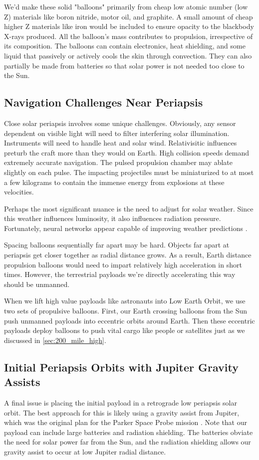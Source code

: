 \documentclass{article}
\begin{document}
{We'd make these solid "balloons" primarily from cheap low atomic number (low Z) materials like boron nitride, motor oil, and graphite.  A small amount of cheap higher Z materials like iron would be included to ensure opacity to the blackbody X-rays produced.  
All the balloon's mass contributes to propulsion, irrespective of its composition.  The balloons can contain electronics, heat shielding, and some liquid that passively or actively cools the skin through convection.     They can also partially be made from batteries so that solar power is not needed too close to the Sun.    

\subsection{Navigation Challenges Near Periapsis}\label{sec:periapsis_challenges}
Close solar periapsis involves some unique challenges.   Obviously, any sensor dependent on visible light will need to filter interfering solar illumination.   Instruments will need to handle heat and solar wind.  Relativisitic influences preturb the craft more than they would on Earth.  High collision speeds demand extremely accurate navigation.   The pulsed propulsion chamber may ablate slightly on each pulse.  The impacting projectiles must be miniaturized to at most a few kilograms to contain the immense energy from explosions at these velocities. 

Perhaps the most significant nuance is the need to adjust for solar weather.  Since this weather influences luminosity, it also influences radiation pressure.   Fortunately, neural networks appear capable of improving weather predictions \cite{lam2023learning}.   

Spacing balloons sequentially far apart  may be hard.  Objects far apart at periapsis get closer together as radial distance grows.  As a result, Earth distance propulsion balloons would need to impart relatively high acceleration in short times.  However, the terrestrial payloads we're directly accelerating this way should be unmanned.   

When we lift high value payloads like astronauts into Low Earth Orbit, we use two sets of propulsive balloons. First, our Earth crossing balloons from the Sun push unmanned payloads into eccentric orbits around Earth. Then these eccentric payloads deploy balloons to push vital cargo like people or  satellites just as we discussed in \autoref{sec:200_mile_high}.

\subsection{Initial Periapsis Orbits with Jupiter Gravity Assists} \label{sec:jupiter_gravity_initial}
A final issue is placing the initial payload in a retrograde low periapsis solar orbit.  The best approach for this is likely using a gravity assist from Jupiter, which was the original plan for the Parker Space Probe mission \cite{mccomas2005solar}. Note that our payload can include large batteries and radiation shielding.  The batteries obviate the need for solar power far from the Sun, and the radiation shielding allows our gravity assist to occur at low Jupiter radial distance.   

}
\end{document}
